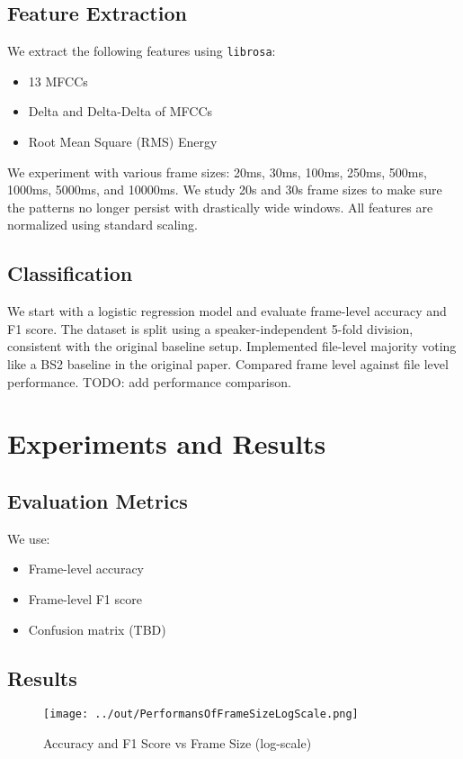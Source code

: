 \documentclass[conference]{IEEEtran}
\begin{document}
\subsection{Feature Extraction}
We extract the following features using \texttt{librosa}:
\begin{itemize}
    \item 13 MFCCs
    \item Delta and Delta-Delta of MFCCs
    \item Root Mean Square (RMS) Energy
\end{itemize}

We experiment with various frame sizes: 20ms, 30ms, 100ms, 250ms, 500ms, 1000ms, 5000ms, and 10000ms. 
We study 20s and 30s frame sizes to make sure the patterns no longer persist with drastically wide windows. 
All features are normalized using standard scaling.

\subsection{Classification}
We start with a logistic regression model and evaluate frame-level accuracy and F1 score. 
The dataset is split using a speaker-independent 5-fold division, consistent with the original baseline setup.
Implemented file-level majority voting like a BS2 baseline in the original paper.
Compared frame level against file level performance. TODO: add performance comparison.


\section{Experiments and Results}

\subsection{Evaluation Metrics}
We use:
\begin{itemize}
    \item Frame-level accuracy
    \item Frame-level F1 score
    \item Confusion matrix (TBD)
\end{itemize}

\subsection{Results}
\begin{figure}[h]
    \centering
    \texttt{[image: ../out/PerformansOfFrameSizeLogScale.png]}
    \caption{Accuracy and F1 Score vs Frame Size (log-scale)}
    \label{fig:performance}
\end{figure}
\end{document}

